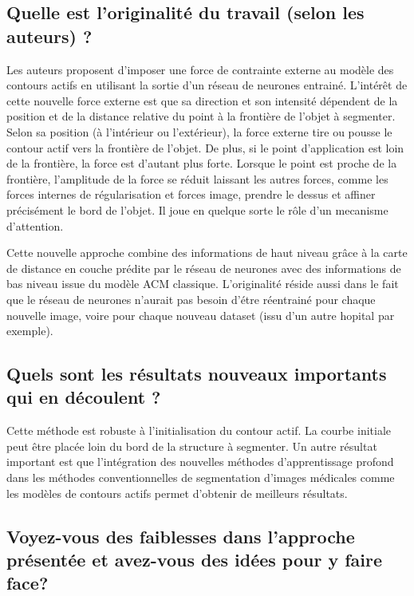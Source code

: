 \documentclass[a4paper, 11pt]{article}
\begin{document}
\subsection{Quelle est l'originalité du travail (selon les auteurs) ?}

Les auteurs proposent d'imposer une force de contrainte externe au modèle des contours actifs en utilisant la sortie d'un réseau de neurones entrainé. L'intérêt de cette nouvelle force externe est que sa direction et son intensité dépendent de la position et de la distance relative du point à la frontière de l'objet à segmenter. Selon sa position (à l'intérieur ou l'extérieur), la force externe tire ou pousse le contour actif vers la frontière de l'objet. De plus, si le point d'application est loin de la frontière, la force est d'autant plus forte. Lorsque le point est proche de la frontière, l'amplitude de la force se réduit laissant les autres forces, comme les forces internes de régularisation et forces image, prendre le dessus et affiner précisément le bord de l'objet. Il joue en quelque sorte le rôle d'un mecanisme d'attention.

Cette nouvelle approche combine des informations de haut niveau grâce à la carte de distance en couche prédite par le réseau de neurones avec des informations de bas niveau issue du modèle ACM classique. L'originalité réside aussi dans le fait que le réseau de neurones n'aurait pas besoin d'étre réentrainé pour chaque nouvelle image, voire pour chaque nouveau dataset (issu d'un autre hopital par exemple). 

\subsection{Quels sont les résultats nouveaux importants qui en découlent ?}

Cette méthode est robuste à l'initialisation du contour actif. La courbe initiale peut être placée loin du bord de la structure à segmenter. Un autre résultat important est que l'intégration des nouvelles méthodes d'apprentissage profond dans les méthodes conventionnelles de segmentation d'images médicales comme les modèles de contours actifs permet d'obtenir de meilleurs résultats.

\subsection{Voyez-vous des faiblesses dans l'approche présentée et avez-vous des idées pour y faire face?}
\end{document}
